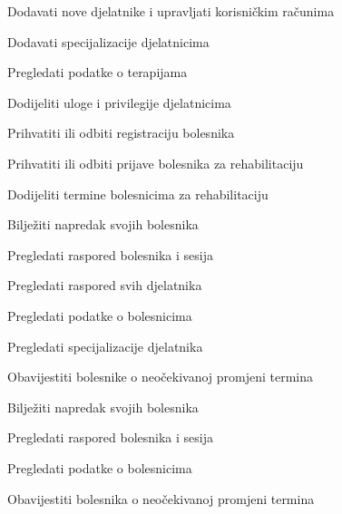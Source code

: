 \begin{packed_enum}
	\item  {}

	\begin{packed_enum}

		\item Dodavati nove djelatnike i upravljati korisničkim računima
		\item Dodavati specijalizacije djelatnicima
		\item Pregledati podatke o terapijama
		\item Dodijeliti uloge i privilegije djelatnicima

	\end{packed_enum}

	\item  {}

	\begin{packed_enum}

		\item Prihvatiti ili odbiti registraciju bolesnika
		\item Prihvatiti ili odbiti prijave bolesnika za rehabilitaciju
		\item Dodijeliti termine bolesnicima za rehabilitaciju
		\item Bilježiti napredak svojih bolesnika %
		\item Pregledati raspored bolesnika i sesija
		\item Pregledati raspored svih djelatnika
		\item Pregledati podatke o bolesnicima
		\item Pregledati specijalizacije djelatnika
		\item Obavijestiti bolesnike o neočekivanoj promjeni termina

	\end{packed_enum}

	\item  {}

	\begin{packed_enum}

		\item Bilježiti napredak svojih bolesnika %
		\item Pregledati raspored bolesnika i sesija
		\item Pregledati podatke o bolesnicima
		\item Obavijestiti bolesnika o neočekivanoj promjeni termina


\end{packed_enum}
\end{packed_enum}
